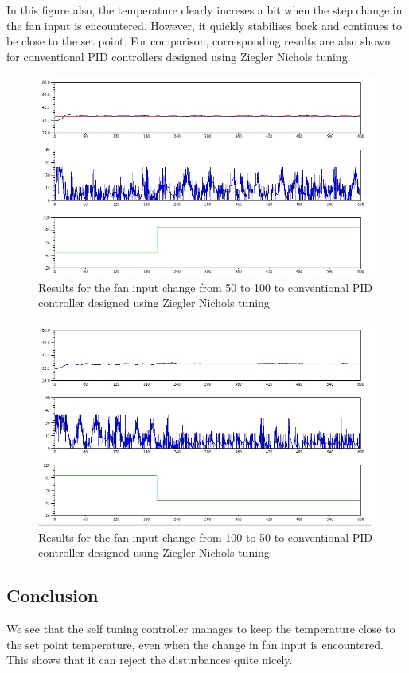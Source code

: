 In this figure also, the temperature clearly increses a bit when the step change in the fan input is encountered. However, 
it quickly stabilises back and continues to be close to the set point.
\newpage
For comparison, corresponding results are also shown for conventional PID controllers designed using Ziegler Nichols tuning.
\begin{figure}[h]
	\centering
\includegraphics[width=.75\linewidth]{Vikas_self/report_tex/PID_results/Conventional_Tuning/Fan_disturbance/PID/step50to100.jpg}
	\caption{Results for the fan input change from 50 to 100 to conventional PID controller designed using Ziegler Nichols tuning}
	
\end{figure}

\begin{figure}[h]
	\centering
\includegraphics[width=.75\linewidth]{Vikas_self/report_tex/PID_results/Conventional_Tuning/Fan_disturbance/PID/step100to50.jpg}
	\caption{Results for the fan input change from 100 to 50 to conventional PID controller designed using Ziegler Nichols tuning}
	
\end{figure}

\subsection{Conclusion}
We see that the self tuning controller manages to keep the temperature close to the set point temperature, even when the 
change in fan input is encountered. This shows that it can reject the disturbances quite nicely.
\newpage
